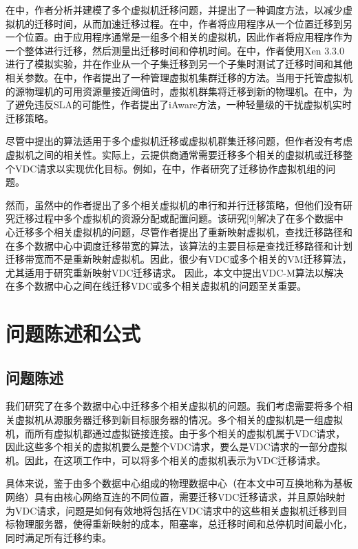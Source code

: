 在\cite{zhang2013scheduling}中，作者分析并建模了多个虚拟机迁移问题，并提出了一种调度方法，以减少虚拟机的迁移时间，从而加速迁移过程。在\cite{keller2012live}中，作者将应用程序从一个位置迁移到另一个位置。由于应用程序通常是一组多个相关的虚拟机，因此作者将应用程序作为一个整体进行迁移，然后测量出迁移时间和停机时间。在\cite{atif2014adaptive}中，作者使用Xen 3.3.0进行了模拟实验，并在作业从一个子集迁移到另一个子集时测试了迁移时间和其他相关参数。在\cite{yang2014method}中，作者提出了一种管理虚拟机集群迁移的方法。当用于托管虚拟机的源物理机的可用资源量接近阈值时，虚拟机群集将迁移到新的物理机。在\cite{xu2013iaware}中，为了避免违反SLA的可能性，作者提出了iAware方法，一种轻量级的干扰虚拟机实时迁移策略。

尽管\cite{zhang2013scheduling,keller2012live,atif2014adaptive,yang2014method,xu2013iaware}中提出的算法适用于多个虚拟机迁移或虚拟机群集迁移问题，但作者没有考虑虚拟机之间的相关性。实际上，云提供商通常需要迁移多个相关的虚拟机或迁移整个VDC请求以实现优化目标。例如，在\cite{cerroni2014multiple,callegati2013live}中，作者研究了迁移协作虚拟机组的问题。

然而，虽然\cite{cerroni2014multiple,callegati2013live}中的作者提出了多个相关虚拟机的串行和并行迁移策略，但他们没有研究迁移过程中多个虚拟机的资源分配或配置问题。该研究[9]解决了在多个数据中心迁移多个相关虚拟机的问题，尽管作者提出了重新映射虚拟机，查找迁移路径和在多个数据中心中调度迁移带宽的算法，该算法的主要目标是查找迁移路径和计划迁移带宽而不是重新映射虚拟机。因此，很少有VDC或多个相关的VM迁移算法，尤其适用于研究重新映射VDC迁移请求。
因此，本文中提出VDC-M算法以解决在多个数据中心之间在线迁移VDC或多个相关虚拟机的问题至关重要。

\chapter{问题陈述和公式}

\section{问题陈述}
我们研究了在多个数据中心中迁移多个相关虚拟机的问题。我们考虑需要将多个相关虚拟机从源服务器迁移到新目标服务器的情况。多个相关的虚拟机是一组虚拟机，而所有虚拟机都通过虚拟链接连接。由于多个相关的虚拟机属于VDC请求，因此这些多个相关的虚拟机要么是整个VDC请求，要么是VDC请求的一部分虚拟机。因此，在这项工作中，可以将多个相关的虚拟机表示为VDC迁移请求。

具体来说，鉴于由多个数据中心组成的物理数据中心（在本文中可互换地称为基板网络）具有由核心网络互连的不同位置，需要迁移VDC迁移请求，并且原始映射为VDC请求，问题是如何有效地将包括在VDC请求中的这些相关虚拟机迁移到目标物理服务器，使得重新映射的成本，阻塞率，总迁移时间和总停机时间最小化，同时满足所有迁移约束。

